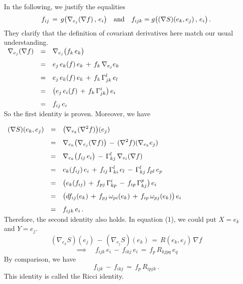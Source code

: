 \documentclass{article}[12pt,a4paper]
\begin{document}
In the following, we justify the equalities
$$ f_{ij}\,=\, g\big(\nabla_{e_j}(\nabla f)\,,\,e_i\big)
\quad \mbox{and} \quad f_{ijk} = g\big((\nabla S)(e_k, e_j)\,,\,e_i\big)\,.$$
They clarify that the definition of covariant derivatives here match our usual understanding. \\[0.1in]
$\begin{array}{rcl}
\nabla_{e_j}(\nabla f) &=& \displaystyle \nabla_{e_j}\big(f_k\, e_k\big) \\[0.1in]
&=& \displaystyle 
	e_j\,e_k(f)\, e_k \,+\, f_k \, \nabla_{e_j}e_k \\[0.1in]
&=& \displaystyle 
	e_j\,e_k(f)\, e_k \,+\, f_k \, \Gamma_{jk}^l\, e_l \\[0.1in]
&=& \displaystyle
	\big(e_j\, e_i(f) \,+\, f_k\, \Gamma_{jk}^i\big)\, e_i \\[0.1in]
&=& \displaystyle 
	f_{ij}\, e_i 
\end{array}$\\[0.2in]
So the first identity is proven. Moreover, we have \\
\newpage

$\begin{array}{rcl}
(\nabla S)(e_k, e_j) &=& \displaystyle \big(\nabla_{e_k}(\nabla^2 f)\big)(e_j) \\[0.1in]
&=& \displaystyle 
	\nabla_{e_k}\big(\nabla_{e_j}(\nabla f)\big) \,-\, (\nabla^2 f)(\nabla_{e_k}e_j) \\[0.1in]
&=& \displaystyle 
	\nabla_{e_k}\big(f_{ij}\, e_i\big) \,-\, \Gamma_{kj}^l\, \nabla_{e_l}(\nabla f) \\[0.1in]
&=& \displaystyle 
	e_k(f_{ij})\, e_i \,+\, f_{ij}\, \Gamma_{ki}^l\, e_l \,-\, \Gamma_{kj}^l \, f_{pl}\, e_p \\[0.1in]
&=& \displaystyle 
	\big( e_k(f_{ij}) \,+\, f_{pj}\, \Gamma_{kp}^i \,-\, f_{ip}\, \Gamma_{kj}^p \big) \, e_i \\[0.1in]
&=& \displaystyle 
	\big( df_{ij}(e_k) \,+\, f_{pj}\,\omega_{pi}(e_k) \,+\, f_{ip}\, \omega_{pj}(e_k)\big) \, e_i \\[0.1in] 
&=& \displaystyle 
	f_{ijk}\, e_i \,.
\end{array}$\\[0.2in]
Therefore, the second identity also holds. In equation (1), we could put $X=e_k$ and $Y=e_j$. 
$$ (\nabla_{e_k} S)(e_j) \,-\, (\nabla_{e_j} S)(e_k) \,=\, R(e_k, e_j)\,\nabla f $$
$$ \implies\quad f_{ijk}\, e_i \,-\, f_{ikj}\, e_i \,=\, f_p \, R_{kjpq}\, e_q $$
By comparison, we have 
\begin{equation} 
f_{ijk} \,-\, f_{ikj} \,=\,  f_p \, R_{ipjk} \,.
\end{equation}
This identity is called the Ricci identity.
\vspace*{0.2in}
\end{document}
